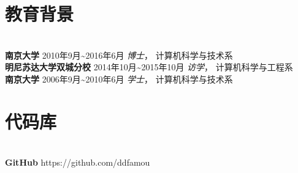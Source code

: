 \documentclass{res}[8.5pt]
\begin{document}
\begin{resume}
\vspace{-12pt}
\section{{教育背景}}
\vspace{-12pt}
\hrulefill\\
{\bf 南京大学} \hfill  2010年9月\textasciitilde 2016年6月 \hspace{0.25in} 
{\sl 博士}， 计算机科学与技术系\\
{\bf 明尼苏达大学双城分校} \hfill 2014年10月\textasciitilde 2015年10月 \hspace{0.25in} 
{\sl 访学}， 计算机科学与工程系  \\
{\bf 南京大学}  \hfill 2006年9月\textasciitilde 2010年6月  \hspace{0.25in} 
{\sl 学士}， 计算机科学与技术系

\vspace{-12pt}
\section{{代码库}}
\vspace{-12pt}
\hrulefill\\
{\bf GitHub} \hfill https://github.com/ddfamou

\end{resume}
\end{document}
